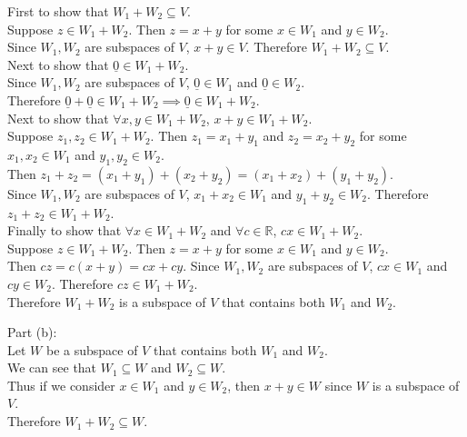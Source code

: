 \documentclass[answers,12pt,addpoints]{exam}
\begin{document}
\begin{questions}
\begin{solution}
        First to show that $W_1 + W_2 \subseteq V$.\\
        Suppose $z \in W_1 + W_2$. Then $z = x + y$ for some $x \in W_1$ and $y \in W_2$.\\
        Since $W_1, W_2$ are subspaces of $V$, $x + y \in V$. Therefore $W_1 + W_2 \subseteq V$.\\
        Next to show that $\underline{0} \in W_1 + W_2$.\\
        Since $W_1, W_2$ are subspaces of $V$, $\underline{0} \in W_1$ and $\underline{0} \in W_2$.\\
        Therefore $\underline{0} + \underline{0} \in W_1 + W_2 \implies \underline{0} \in W_1 + W_2$.\\
        Next to show that $\forall x,y \in W_1 + W_2$, $x + y \in W_1 + W_2$.\\
        Suppose $z_1, z_2 \in W_1 + W_2$. Then $z_1 = x_1 + y_1$ and $z_2 = x_2 + y_2$ for some $x_1, x_2 \in W_1$ and $y_1, y_2 \in W_2$.\\
        Then $z_1 + z_2 = (x_1 + y_1) + (x_2 + y_2) = (x_1 + x_2) + (y_1 + y_2)$.\\
        Since $W_1, W_2$ are subspaces of $V$, $x_1 + x_2 \in W_1$ and $y_1 + y_2 \in W_2$. Therefore $z_1 + z_2 \in W_1 + W_2$.\\
        Finally to show that $\forall x \in W_1 + W_2$ and $\forall c \in \mathbb{R}$, $cx \in W_1 + W_2$.\\
        Suppose $z \in W_1 + W_2$. Then $z = x + y$ for some $x \in W_1$ and $y \in W_2$.\\
        Then $cz = c(x + y) = cx + cy$. Since $W_1, W_2$ are subspaces of $V$, $cx \in W_1$ and $cy \in W_2$. Therefore $cz \in W_1 + W_2$.\\
        Therefore $W_1 + W_2$ is a subspace of $V$ that contains both $W_1$ and $W_2$.\\
    \end{solution}
    \begin{solution}
        Part (b):\\
        Let $W$ be a subspace of $V$ that contains both $W_1$ and $W_2$.\\
        We can see that $W_1 \subseteq W$ and $W_2 \subseteq W$.\\
        Thus if we consider $x \in W_1$ and $y \in W_2$, then $x + y \in W$ since $W$ is a subspace of $V$.\\
        Therefore $W_1 + W_2 \subseteq W$.
    \end{solution}
    

\end{questions}
\end{document}
